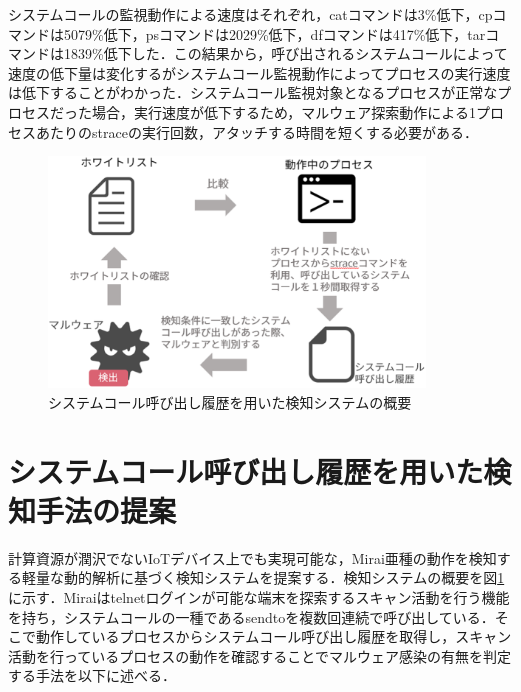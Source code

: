 システムコールの監視動作による速度はそれぞれ，catコマンドは3\%低下，cpコマンドは5079\%低下，psコマンドは2029\%低下，dfコマンドは417\%低下，tarコマンドは1839\%低下した．この結果から，呼び出されるシステムコールによって速度の低下量は変化するがシステムコール監視動作によってプロセスの実行速度は低下することがわかった．システムコール監視対象となるプロセスが正常なプロセスだった場合，実行速度が低下するため，マルウェア探索動作による1プロセスあたりのstraceの実行回数，アタッチする時間を短くする必要がある．




\begin{figure}[h]
   \centering
      \includegraphics[width=100mm]{figures/strace_system.eps}
  \caption{システムコール呼び出し履歴を用いた検知システムの概要}
  \label{fig:strace}
\end{figure}

\section{システムコール呼び出し履歴を用いた検知手法の提案}
計算資源が潤沢でないIoTデバイス上でも実現可能な，Mirai亜種の動作を検知する軽量な動的解析に基づく検知システムを提案する．検知システムの概要を図\ref{fig:strace}に示す．Miraiはtelnetログインが可能な端末を探索するスキャン活動を行う機能を持ち，システムコールの一種であるsendtoを複数回連続で呼び出している．そこで動作しているプロセスからシステムコール呼び出し履歴を取得し，スキャン活動を行っているプロセスの動作を確認することでマルウェア感染の有無を判定する手法を以下に述べる．

